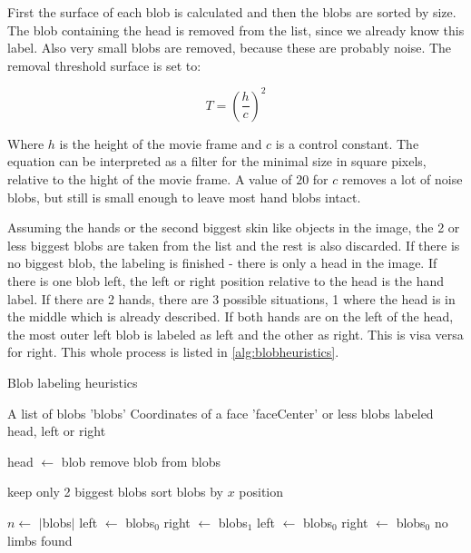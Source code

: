 First the surface of each blob is calculated and then the blobs are sorted by size. The blob containing the head is removed from the list, since we already know this label. Also very small blobs are removed, because these are probably noise. The removal threshold surface is set to:

\begin{equation}
T = (\frac{h}{c})^2
\end{equation}

Where $h$ is the height of the movie frame and $c$ is a control constant. The equation can be interpreted as a filter for the minimal size in square pixels, relative to the hight of the movie frame. A value of $20$ for $c$ removes a lot of noise blobs, but still is small enough to leave most hand blobs intact.

Assuming the hands or the second biggest skin like objects in the image, the 2 or less biggest blobs are taken from the list and the rest is also discarded. If there is no biggest blob, the labeling is finished - there is only a head in the image. If there is one blob left, the left or right position relative to the head is the hand label. If there are 2 hands, there are 3 possible situations, 1 where the head is in the middle which is already described. If both hands are on the left of the head, the most outer left blob is labeled as left and the other as right. This is visa versa for right. This whole process is listed in \autoref{alg:blobheuristics}.

\begin{algorithm}
\caption{Blob labeling heuristics}
\label{alg:blobheuristics}
\begin{algorithmic}
   \REQUIRE A list of blobs 'blobs'
   \REQUIRE Coordinates of a face 'faceCenter'
    or less blobs labeled head, left or right

			\STATE head $\leftarrow$ blob
			\STATE remove blob from blobs
		\ENDIF
	\ENDFOR

	\STATE keep only 2 biggest blobs
	\STATE sort blobs by $x$ position

	\STATE $n \leftarrow $ $|$blobs$|$
	    \STATE left $\leftarrow$ blobs$_0$
	    \STATE right $\leftarrow$ blobs$_1$
	\ELSE
		        \STATE left $\leftarrow$ blobs$_0$
		    \ELSE
		        \STATE right $\leftarrow$ blobs$_0$
			\ENDIF
		\ENDIF
	\ELSE
	    \STATE no limbs found
	\ENDIF
\end{algorithmic}
\end{algorithm}



